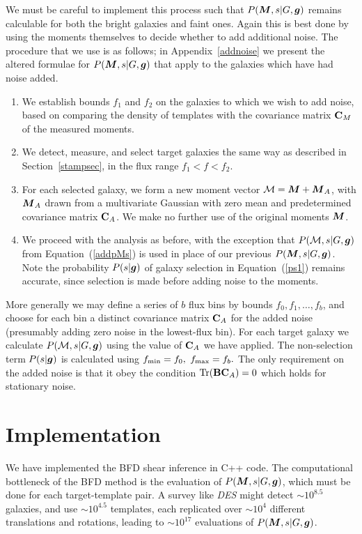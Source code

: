 \documentclass[11pt,preprint,flushrt]{aastex}
\def\eqq#1{Equation~(\ref{#1})}
\newcommand{\vecg}{\mbox{\boldmath $g$}}
\newcommand{\vecM}{\mbox{\boldmath $M$}}
\newcommand{\matC}{\mbox{$\bf C$}}
\newcommand{\matB}{\mbox{$\bf B$}}
\begin{document}
We must be careful to implement this process such that
$P(\vecM, s | G, \vecg)$ remains calculable for both the bright
galaxies and faint ones.  Again this is best done by using the moments
themselves to decide whether to add additional noise.  The procedure
that we use is as follows; in Appendix~\ref{addnoise} we present the
altered formulae for $P(\vecM, s |G, \vecg)$ that apply to the galaxies which
have had noise added.
\begin{enumerate}
\item We establish bounds $f_1$ and $f_2$ on the galaxies to which we
  wish to add noise, based on comparing
  the density of templates with the covariance matrix $\matC_M$ of 
the measured moments.
\item We detect, measure, and select target galaxies the same way as
  described in Section~\ref{stampsec}, in the flux range $f_1<f<f_2.$
\item For each selected galaxy, we form a new moment vector ${\mathcal
    M}=\vecM + \vecM_A$, with $\vecM_A$ drawn 
  from a multivariate Gaussian with zero mean and predetermined
  covariance matrix $\matC_A$.  
  We make no further use of the original moments $\vecM$.
\item We proceed with the analysis as before, with the exception that
  $P({\mathcal M}, s | G, \vecg)$ from \eqq{addpMs} is used in place of our
  previous $P(\vecM,s | G, \vecg)$.  
  Note the probability $P(s|\vecg)$ of galaxy selection in
  \eqq{ps1} remains accurate, since selection is made before adding
  noise to the moments.
\end{enumerate}

More generally we may define a series of $b$ flux bins by bounds
$f_0,f_1,\ldots,f_b$, and choose for each bin a distinct
covariance matrix $\matC_A$ for the added noise (presumably adding
zero noise in the lowest-flux bin).  For each target galaxy we calculate
$P({\mathcal M},s | G, \vecg)$ using the value of $\matC_A$ we have applied.
The non-selection term $P(s|\vecg)$ is calculated using $f_{\rm min}=f_0,$
$f_{\rm max}=f_b.$  The only requirement on the added noise is that it
obey the condition ${\rm Tr}(\matB\matC_A)=0$ which holds for
stationary noise.

\section{Implementation}
\label{algorithm}
We have implemented the BFD shear inference in C++ code.
The computational bottleneck of the BFD method is the evaluation of
$P(\vecM,s|G, \vecg)$, which must be done for each target-template pair.  A
survey like \emph{DES} might detect $\sim10^{8.5}$ galaxies, and use
$\sim10^{4.5}$ templates, each replicated over $\sim10^4$ different
translations and rotations, leading to $\sim10^{17}$ evaluations of
$P(\vecM,s | G, \vecg)$.
\end{document}
